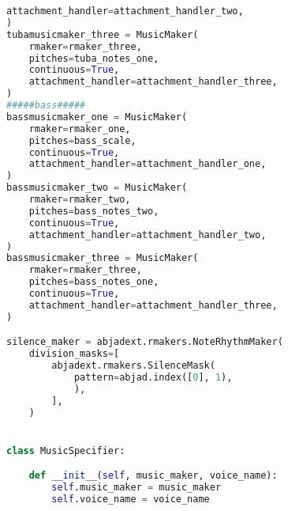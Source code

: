 \begin{lstlisting}[language=Python, caption=Tianshu Segment\_IV]
    attachment_handler=attachment_handler_two,
)
tubamusicmaker_three = MusicMaker(
    rmaker=rmaker_three,
    pitches=tuba_notes_one,
    continuous=True,
    attachment_handler=attachment_handler_three,
)
#####bass#####
bassmusicmaker_one = MusicMaker(
    rmaker=rmaker_one,
    pitches=bass_scale,
    continuous=True,
    attachment_handler=attachment_handler_one,
)
bassmusicmaker_two = MusicMaker(
    rmaker=rmaker_two,
    pitches=bass_notes_two,
    continuous=True,
    attachment_handler=attachment_handler_two,
)
bassmusicmaker_three = MusicMaker(
    rmaker=rmaker_three,
    pitches=bass_notes_one,
    continuous=True,
    attachment_handler=attachment_handler_three,
)

silence_maker = abjadext.rmakers.NoteRhythmMaker(
    division_masks=[
        abjadext.rmakers.SilenceMask(
            pattern=abjad.index([0], 1),
            ),
        ],
    )


class MusicSpecifier:

    def __init__(self, music_maker, voice_name):
        self.music_maker = music_maker
        self.voice_name = voice_name



\end{lstlisting}
